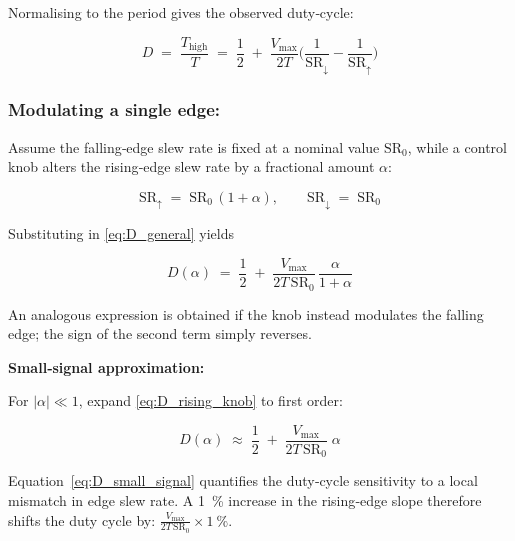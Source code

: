 Normalising to the period gives the observed duty‑cycle:

\begin{equation}
D
  \;=\;
  \frac{T_{\text{high}}}{T}
  \;=\;
  \frac{1}{2}
  \;+\;
  \frac{V_{\max}}{2T}
  \biggl(
     \frac{1}{\text{SR}_{\downarrow}}
    -\frac{1}{\text{SR}_{\uparrow}}
  \biggr)
\label{eq:D_general}
\end{equation}

\subsubsection{Modulating a single edge:}

Assume the falling‑edge slew rate is fixed at a nominal value
\(\text{SR}_{0}\), while a control knob alters the rising‑edge
slew rate by a fractional amount \(\alpha\):

\begin{equation}
\text{SR}_{\uparrow} \;=\; \text{SR}_{0}\,(1+\alpha),
\qquad
\text{SR}_{\downarrow} \;=\; \text{SR}_{0}
\end{equation}

Substituting in \eqref{eq:D_general} yields

\begin{equation}
D(\alpha)
  \;=\;
  \frac{1}{2}
  \;+\;
  \frac{V_{\max}}{2T\,\text{SR}_{0}}
  \,\frac{\alpha}{1+\alpha}
\label{eq:D_rising_knob}
\end{equation}

\noindent
An analogous expression is obtained if the knob instead modulates
the falling edge; the sign of the second term simply reverses.

\textbf{Small‑signal approximation:}

For \(|\alpha|\ll 1\), expand \eqref{eq:D_rising_knob} to first order:

\begin{equation}
D(\alpha)
  \;\approx\;
  \frac{1}{2}
  \;+\;
  \frac{V_{\max}}{2T\,\text{SR}_{0}}\;\alpha
\label{eq:D_small_signal}
\end{equation}

Equation~\eqref{eq:D_small_signal} quantifies the duty‑cycle
sensitivity to a local mismatch in edge slew rate.  A
\SI{1}{\percent} increase in the rising‑edge slope therefore shifts the
duty cycle by:
\(\tfrac{V_{\max}}{2T\,\text{SR}_{0}}\times\SI{1}{\percent}\).


